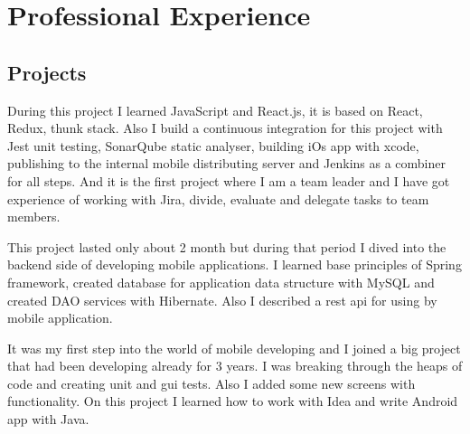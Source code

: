 \documentclass[11pt,a4paper,sans]{moderncv} %
\begin{document}

\section{Professional Experience}




\subsection{Projects}


{During this project I learned JavaScript and React.js, it is based on React, Redux, thunk stack. Also I build a continuous integration for this project with Jest unit testing, SonarQube static analyser, building iOs app with xcode, publishing to the internal mobile distributing server and Jenkins as a combiner for all steps. And it is the first project where I am a team leader and I have got experience of working with Jira, divide, evaluate and delegate tasks to team members.}

{This project lasted only about 2 month but during that period I dived into the backend side of developing mobile applications. I learned base principles of Spring framework, created database for application data structure with MySQL and created DAO services with Hibernate. Also I described a rest api for using by mobile application.}

{It was my first step into the world of mobile developing and I joined a big project that had been developing already for 3 years. I was breaking through the heaps of code and creating unit and gui tests. Also I added some new screens with functionality. On this project I learned how to work with Idea and write Android app with Java.}
\end{document}
